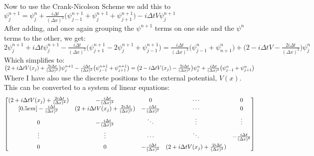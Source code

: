 \documentclass[11pt]{article} %
\begin{document}
Now to use the Crank-Nicolson Scheme we add this to \\

\noindent $\psi ^{n+1} _j =\psi ^n _j +  \frac{i \Delta t}{(\Delta x)^2} \big ( \psi ^{n+1} _{j-1} + \psi ^{n+1} _{j} + \psi ^{n+1} _{j+1} \big ) - i \Delta t V \psi ^{n+1} _j $ \\

After adding, and once again grouping the $\psi ^{n+1}$ terms on one side and the $\psi ^n$ terms to the other, we get: \\

\noindent $2\psi ^{n+1} _ j + i\Delta t \psi ^{n+1} _j -  \frac{i \Delta t}{(\Delta x)^2} \big ( \psi^{n+1} _{j+1} - 2\psi ^{n+1} _j + \psi ^{n+1} _{j-1} \big ) =  \frac{i \Delta t}{(\Delta x)^2} \big ( \psi ^n _{j-1} + \psi ^n _{n+1} \big ) + \big ( 2 - i \Delta t V -  \frac{2i \Delta t}{(\Delta x)^2} \big ) \psi ^n _j$\\

Which simplifies to: \\

\noindent $ \big ( 2 + i\Delta t V(x_j) +  \frac{2i \Delta t}{(\Delta x)^2} \big ) \psi ^{n+1} _ j -  \frac{i \Delta t}{(\Delta x)^2} \big ( \psi ^{n+1} _{j-1} + \psi ^{n+1} _{j+1} \big ) =\\ [0.5em] \big ( 2 - i\Delta t V(x_j) -  \frac{2i \Delta t}{(\Delta x)^2} \big ) \psi ^n _ j +  \frac{i \Delta t}{(\Delta x)^2} \big ( \psi ^n _{j-1} + \psi ^n _{j+1} \big )$ \\

Where I have also use the discrete positions to the external potential, $V(x)$.\\

This can be converted to a system of linear equations: \\
\begin{equation}
\noindent
 \begin{bmatrix}
  (2 + i \Delta t V(x_j) + \frac{2i \Delta t}{(\Delta x)^2})&-\frac{i \Delta t}{(\Delta x)^2} &0& \cdots & 0 \\ [0.5em]
  -\frac{i \Delta t}{(\Delta x)^2} &  (2 + i \Delta t V(x_j) + \frac{2i \Delta t}{(\Delta x)^2}) &-\frac{i \Delta t}{(\Delta x)^2}& \cdots &0 \\[0.5em]
0                                                  & -\frac{i \Delta t}{(\Delta x)^2}                                        & \ddots                                       &\vdots & \vdots \\[0.5em]
  \vdots  & \vdots &\cdots & \ddots &  -\frac{i \Delta t}{(\Delta x)^2}  \\[0.5em]
  0 & 0 & -\frac{i \Delta t}{(\Delta x)^2} &(2 + i \Delta t V(x_j) + \frac{2i \Delta t}{(\Delta x)^2})
 \end{bmatrix}
\nonumber
\end{equation}\\
\end{document}
